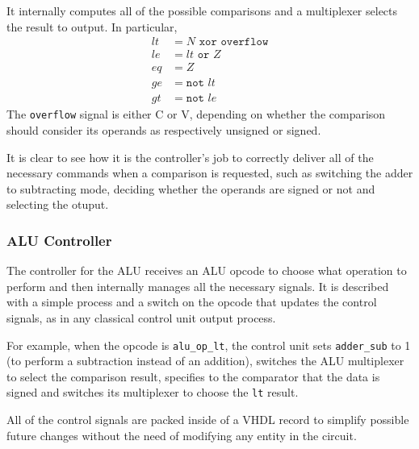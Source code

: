 It internally computes all of the possible comparisons and a multiplexer selects the result to output. In particular,
\begin{align*}
    lt &= N \texttt{ xor } \texttt{overflow} \\
    le &= lt \texttt{ or } Z \\
    eq &= Z \\
    ge &= \texttt{not } lt \\
    gt &= \texttt{not } le
\end{align*}
The \texttt{overflow} signal is either C or V, depending on whether the comparison should consider its operands as
respectively unsigned or signed.

It is clear to see how it is the controller's job to correctly deliver all of the necessary commands when a comparison
is requested, such as switching the adder to subtracting mode, deciding whether the operands are signed or not and
selecting the otuput.

\subsubsection{ALU Controller}
The controller for the ALU receives an ALU opcode to choose what operation to perform and then internally manages all
the necessary signals. It is described with a simple process and a switch on the opcode that updates the control
signals, as in any classical control unit output process.

For example, when the opcode is \texttt{alu\_op\_lt}, the control unit sets \texttt{adder\_sub} to 1 (to perform a
subtraction instead of an addition), switches the ALU multiplexer to select the comparison result, specifies to the
comparator that the data is signed and switches its multiplexer to choose the \texttt{lt} result.

All of the control signals are packed inside of a VHDL record to simplify possible future changes without the need of
modifying any entity in the circuit.


